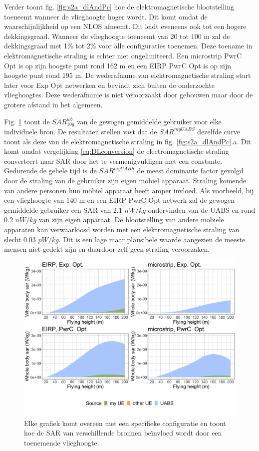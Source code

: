 \documentclass[twocolumn]{phdsymp_dutch}
\begin{document}
Verder toont fig.  \ref{fig:s2a_dlAndPc} hoe de elektromagnetische blootstelling toeneemt wanneer de vlieghoogte hoger wordt. 
Dit komt omdat de waarschijnlijkheid op een \gls{NLOS} afneemt.
Dit leidt eveneens ook tot een hogere dekkingsgraad.
Wanneer de vlieghoogte toeneemt van 20 tot 100 m zal de dekkingsgraad met 1\% tot 2\% voor alle configuraties toenemen.
Deze toename in elektromagnetische straling is echter niet ongelimiteerd. Een microstrip \gls{PwrC Opt}
is op zijn hoogste punt rond 162 m en een \gls{EIRP} \gls{PwrC Opt} is op zijn hoogste punt rond 195 m.
De wederafname van elektromagnetische straling start later voor \gls{Exp Opt} netwerken 
en bevindt zich buiten de onderzochte vlieghoogtes. 
Deze wederafname is niet veroorzaakt door gebouwen maar door de grotere afstand in het algemeen.

Fig. \ref{fig:s2shfourSourcesMatrix} toont de $SAR^{wb}_{10g}$ van de gewogen gemiddelde gebruiker voor elke individuele bron.
De resultaten stellen vast dat de $SAR^{myUABS}$ dezelfde curve toont als deze van de elektromagnetische straling in fig. \ref{fig:s2a_dlAndPc}.a. Dit komt omdat vergelijking \ref{eq:DLconversion} de electromagnetische straling converteert naar \gls{SAR}
door het te vermenigvuldigen met een constante. Gedurende de gehele tijd is de $SAR^{myUABS}$
de meest dominante factor gevolgd door de straling van de gebruiker zijn eigen mobiel apparaat.
Straling komende van andere personen hun mobiel apparaat heeft amper invloed.
Als voorbeeld, bij een vlieghoogte van 140 m en een \gls{EIRP} \gls{PwrC Opt} netwerk
zal de gewogen gemiddelde gebruiker een \gls{SAR} van
2.1 $nW/kg$ ondervinden van de  \gls{UABS} en rond
 0.2 $nW/kg$ van zijn eigen apparaat.
De blootstelling van andere mobiele apparaten kan verwaarloosd worden met een elektromagnetische straling van slecht
 0.03 $pW/kg$. Dit is een lage maar plausibele waarde aangezien de meeste mensen niet gedekt zijn 
en daardoor zelf geen straling veroorzaken.


\begin{figure}[h!]
  \includegraphics[width=\linewidth]{s2/fhFourSources.png}
  \caption{Elke grafiek komt overeen met een specifieke configuratie en toont hoe de 
     \acs{SAR} van verschillende bronnen be\"invloed wordt door een toenemende vlieghoogte.}
  \label{fig:s2shfourSourcesMatrix}
\end{figure}
\end{document}
